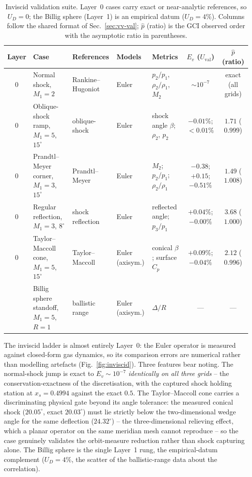 \documentclass[journal,biblatex]{new-aiaa}
\begin{document}
\begin{table}[H]
\centering\scriptsize\setlength{\tabcolsep}{3.5pt}
\caption{Inviscid validation suite. Layer~0 cases carry exact or near-analytic
references, so $U_D=0$; the Billig sphere (Layer~1) is an empirical datum
($U_D{=}4\%$). Columns follow the shared format of Sec.~\ref{sec:vv-val};
$\hat p$ (ratio) is the GCI observed order with the asymptotic ratio in
parentheses.}
\label{tab:val-inviscid}
\begin{tabularx}{\linewidth}{@{}c >{\raggedright\arraybackslash}p{2.4cm} >{\raggedright\arraybackslash}p{1.9cm} >{\raggedright\arraybackslash}p{1.35cm} X c c@{}}
\toprule
Layer & Case & References & Models & Metrics & $E_v$ ($U_{\mathrm{val}}$) & $\hat p$ (ratio) \\
\midrule
0 & Normal shock, $M_1{=}2$ & Rankine--Hugoniot & Euler & $p_2/p_1$, $\rho_2/\rho_1$, $M_2$ & $\sim10^{-7}$ & exact (all grids) \\
0 & Oblique-shock ramp, $M_1{=}5$, $15^\circ$ & oblique-shock & Euler & shock angle $\beta$; $\rho_2$, $p_2$ & $-0.01\%$; $<0.01\%$ & $1.71$ ($0.999$) \\
0 & Prandtl--Meyer corner, $M_1{=}3$, $15^\circ$ & Prandtl--Meyer & Euler & $M_2$; $p_2/p_1$; $\rho_2/\rho_1$ & $-0.38$; $+0.15$; $-0.51\%$ & $1.49$ ($1.008$) \\
0 & Regular reflection, $M_1{=}3$, $8^\circ$ & shock reflection & Euler & reflected angle; $p_3/p_1$ & $+0.04\%$; $-0.00\%$ & $3.68$ ($1.000$) \\
0 & Taylor--Maccoll cone, $M_1{=}5$, $15^\circ$ & Taylor--Maccoll~\cite{taylor_air_1933} & Euler (axisym.) & conical $\beta$; surface $C_p$ & $+0.09\%$; $-0.04\%$ & $2.12$ ($0.996$) \\
\addlinespace
1 & Billig sphere standoff, $M_1{=}5$, $R=1$ & ballistic range~\cite{billig_shock-wave_1967} & Euler (axisym.) & $\Delta/R$ & --- & --- \\
\bottomrule
\end{tabularx}
\end{table}

The inviscid ladder is almost entirely Layer~0: the Euler operator is measured against closed-form gas dynamics, so its comparison errors are numerical rather than modelling artefacts (Fig.~\ref{fig:inviscid}). Three features bear noting. The normal-shock jump is exact to $E_v\sim10^{-7}$ \emph{identically on all three grids} -- the conservation-exactness of the discretisation, with the captured shock holding station at $x_s=0.4994$ against the exact $0.5$. The Taylor--Maccoll cone carries a discriminating physical gate beyond its angle tolerance: the measured conical shock ($20.05^\circ$, exact $20.03^\circ$) must lie strictly below the two-dimensional wedge angle for the same deflection ($24.32^\circ$) -- the three-dimensional relieving effect, which a planar operator on the same meridian mesh cannot reproduce -- so the case genuinely validates the orbit-measure reduction rather than shock capturing alone. The Billig sphere is the single Layer~1 rung, the empirical-datum complement ($U_D=4\%$, the scatter of the ballistic-range data about the correlation).
\end{document}
